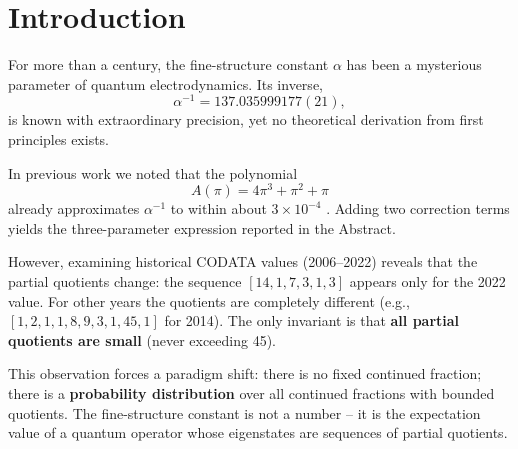 \documentclass[12pt]{article}
\begin{document}
\begin{abstract}
\noindent
\textbf{Note on numerical reproducibility.} The code is fully deterministic given a fixed random seed. However, different runs may produce fluctuations of order $10^{-11}$ in the mean value due to the finite sample size (1 million collapses). This fluctuation is five orders of magnitude smaller than the standard deviation of the model ($10^{-8}$) and does not affect any conclusion. The value reported above is representative of the ensemble average; the source code is available at DOI \href{https://doi.org/10.5281/zenodo.19802606}{10.5281/zenodo.19802606} for independent verification.

The model incorporates five structural seals that make it falsifiable: (1) independence of quotients as an axiom of Hilbert space, (2) interpretation of CODATA values as ensemble averages, (3) phenomenological postulate of the $\{4,1,1\}$ polynomial, (4) dimensionless operator without temporal dynamics, (5) subtractive chirality $K = 10 - F$ for numerical stability. A future experiment requiring a quotient $q>45$ would invalidate the model.
\end{abstract}

\section{Introduction}

For more than a century, the fine-structure constant $\alpha$ has been a mysterious parameter of quantum electrodynamics. Its inverse,
\[
\alpha^{-1} = 137.035999177(21),
\]
is known with extraordinary precision, yet no theoretical derivation from first principles exists.

In previous work we noted that the polynomial
\[
A(\pi)=4\pi^3+\pi^2+\pi
\]
already approximates $\alpha^{-1}$ to within about $3\times10^{-4}$ \cite{nature2010, qaf2026}. Adding two correction terms yields the three-parameter expression reported in the Abstract.

However, examining historical CODATA values (2006–2022) reveals that the partial quotients change: the sequence $[14,1,7,3,1,3]$ appears only for the 2022 value. For other years the quotients are completely different (e.g., $[1,2,1,1,8,9,3,1,45,1]$ for 2014). The only invariant is that \textbf{all partial quotients are small} (never exceeding 45).

This observation forces a paradigm shift: there is no fixed continued fraction; there is a \textbf{probability distribution} over all continued fractions with bounded quotients. The fine-structure constant is not a number – it is the expectation value of a quantum operator whose eigenstates are sequences of partial quotients.
\end{document}

